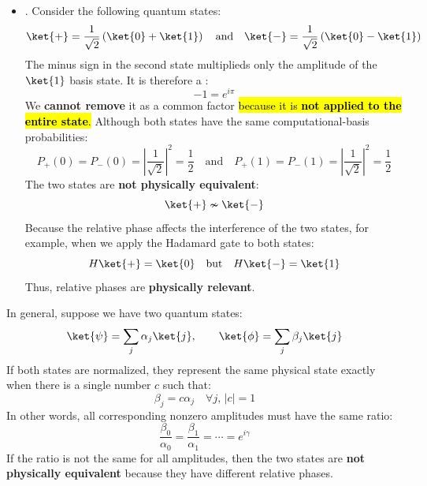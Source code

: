 \begin{itemize}
    \item {}. Consider the following quantum states:
    \begin{equation*}
        \ket{+} = \frac{1}{\sqrt{2}} \left(\ket{0} + \ket{1}\right) \quad \text{and} \quad \ket{-} = \frac{1}{\sqrt{2}} \left(\ket{0} - \ket{1}\right)
    \end{equation*}
    The minus sign in the second state multiplieds only the amplitude of the $\ket{1}$ basis state. It is therefore a :
    \begin{equation*}
        -1 = e^{i \pi}
    \end{equation*}
    We \textbf{cannot remove} it as a common factor \hl{because it is \textbf{not applied to the entire state}.} Although both states have the same computational-basis probabilities:
    \begin{equation*}
        P_{+}(0) = P_{-}(0) = \left|\frac{1}{\sqrt{2}}\right|^{2} = \frac{1}{2} \quad \text{and} \quad P_{+}(1) = P_{-}(1) = \left|\frac{1}{\sqrt{2}}\right|^{2} = \frac{1}{2}
    \end{equation*}
    The two states are \textbf{not physically equivalent}:
    \begin{equation*}
        \ket{+} \nsim \ket{-}
    \end{equation*}
    Because the relative phase affects the interference of the two states, for example, when we apply the Hadamard gate to both states:
    \begin{equation*}
        H\ket{+} = \ket{0} \quad \text{but} \quad H\ket{-} = \ket{1}
    \end{equation*}
    Thus, relative phases are \textbf{physically relevant}.
\end{itemize}
In general, suppose we have two quantum states:
\begin{equation*}
    \ket{\psi} = \sum_j \alpha_j \ket{j}, \qquad \ket{\phi} = \sum_j \beta_j \ket{j}
\end{equation*}
If both states are normalized, they represent the same physical state exactly when there is a single number $c$ such that:
\begin{equation*}
    \beta_j = c \alpha_j \quad \forall j, \, \left|c\right| = 1
\end{equation*}
In other words, all corresponding nonzero amplitudes must have the same ratio:
\begin{equation*}
    \frac{\beta_0}{\alpha_0} = \frac{\beta_1}{\alpha_1} = \cdots = e^{i \gamma}
\end{equation*}
If the ratio is not the same for all amplitudes, then the two states are \textbf{not physically equivalent} because they have different relative phases.


